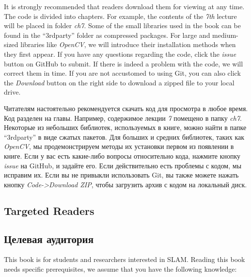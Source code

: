 \begin{English}
    It is strongly recommended that readers download them for viewing at any time. The code is divided into chapters. For example, the contents of the \textit{7th} lecture will be placed in folder \textit{ch7}. Some of the small libraries used in the book can be found in the ``3rdparty'' folder as compressed packages. For large and medium-sized libraries like \textit{OpenCV}, we will introduce their installation methods when they first appear. If you have any questions regarding the code, click the \textit{issue} button on GitHub to submit. If there is indeed a problem with the code, we will correct them in time. If you are not accustomed to using Git, you can also click the  \textit{Download} button on the right side to download a zipped file to your local drive.
\end{English}

\begin{Russian}
    Читателям настоятельно рекомендуется скачать код для просмотра в любое время. Код разделен на главы. Например, содержимое лекции \textit{7} помещено в папку \textit{ch7}. Некоторые из небольших библиотек, используемых в книге, можно найти в папке ``3rdparty'' в виде сжатых пакетов. Для больших и средних библиотек, таких как \textit{OpenCV}, мы продемонстрируем методы их установки первом из появлении в книге. Если у вас есть какие-либо вопросы относительно кода, нажмите кнопку \textit{issue} на GitHub, и задайте его. Если действительно есть проблемы с кодом, мы исправим их. Если вы не привыкли использовать Git, вы также можете нажать кнопку \textit{Code->Download ZIP}, чтобы загрузить архив с кодом на локальный диск.
\end{Russian}
    
\begin{English}
    \section*{Targeted Readers}
\end{English}

\begin{Russian}
   \section*{Целевая аудитория}
\end{Russian}

\begin{English}
    This book is for students and researchers interested in SLAM. Reading this book needs specific prerequisites, we assume that you have the following knowledge:
\end{English}

